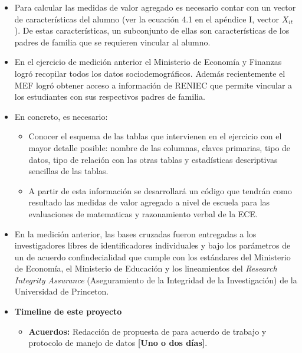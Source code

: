 \documentclass[11pt]{article}
\numberwithin{equation}{section}
\begin{document}
\begin{itemize}

\item {\bf}  Para calcular las medidas de valor agregado es necesario contar con un vector de caracter\'isticas del alumno (ver la ecuaci\'on 4.1 en el ap\'endice I, vector $X_{it}$). De estas caracter\'isticas, un subconjunto de ellas son caracter\'isticas de los padres de familia que se requieren vincular al alumno.

\item {\bf} En el ejercicio de medici\'on anterior el Ministerio de Econom\'ia y Finanzas logr\'o recopilar todos los datos sociodemogr\'aficos. Adem\'as recientemente el MEF logr\'o obtener acceso a informaci\'on de RENIEC que permite vincular a los estudiantes con sus respectivos padres de familia. 

\item {\bf} En concreto, es necesario:
\begin{itemize}
    \item Conocer el esquema de las tablas que intervienen en el ejercicio con el mayor detalle posible: nombre de las columnas, claves primarias, tipo de datos, tipo de relaci\'on con las otras tablas y estad\'isticas descriptivas sencillas de las tablas. 
    \item A partir de esta informaci\'on se desarrollar\'a un c\'odigo que tendr\'an como resultado las medidas de valor agregado a nivel de escuela para las evaluaciones de matematicas y razonamiento verbal de la ECE.
\end{itemize}

\item En la medici\'on anterior, las bases cruzadas fueron entregadas a los investigadores libres de identificadores individuales y bajo los par\'ametros de un de acuerdo confindecialidad que cumple con los est\'andares del Ministerio de Econom\'ia, el Ministerio de Educaci\'on y los lineamientos del {\it Research Integrity Assurance} (Aseguramiento de la Integridad de la Investigaci\'on) de la Universidad de Princeton.

\item {\bf Timeline de este proyecto}

\begin{itemize}

\item {\bf Acuerdos:} Redacci\'on de propuesta de para acuerdo de trabajo y protocolo de manejo de datos {\bf [Uno o dos d\'ias]}.


\end{itemize}
\end{itemize}
\end{document}
